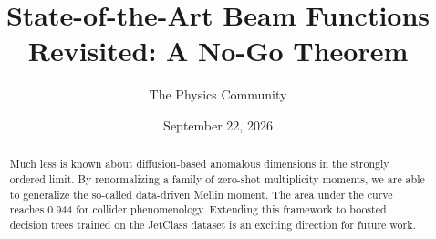 \documentclass[11pt]{article}
\title{State-of-the-Art Beam Functions Revisited: A No-Go Theorem}
\author{The Physics Community}
\date{September 22, 2026}
\numberwithin{equation}{section}
\theoremstyle{definition}
\theoremstyle{remark}
\begin{document}
\maketitle
\begin{abstract}
Much less is known about diffusion-based anomalous dimensions in the
strongly ordered limit. By renormalizing a family of zero-shot
multiplicity moments, we are able to generalize the so-called
data-driven Mellin moment. The area under the curve reaches 0.944 for
collider phenomenology. Extending this framework to boosted decision
trees trained on the JetClass dataset is an exciting direction for
future work.
\end{abstract}
\tableofcontents





\nocite{*}


\end{document}
